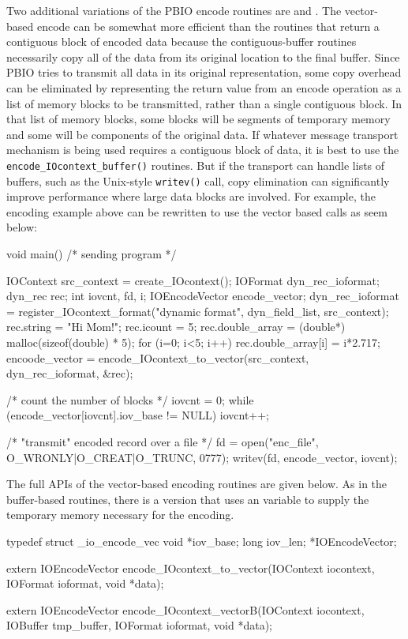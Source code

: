 Two additional variations of the PBIO encode routines are
 and
.  The vector-based encode can be
somewhat more efficient than the routines that return a contiguous block of
encoded data because the contiguous-buffer routines necessarily copy all of
the data from its original location to the final buffer.  Since PBIO tries
to transmit all data in its original representation, some copy overhead can
be eliminated by representing the return value from an encode operation as a
list of memory blocks to be transmitted, rather than a single contiguous
block.  In that list of memory blocks, some blocks will be segments of 
temporary memory and some will be components of the original data.
If whatever message transport mechanism is being used requires a contiguous
block of data, it is best to use the {\tt encode\_IOcontext\_buffer()}
routines.  But if the transport can handle lists of buffers, such as the
Unix-style {\tt writev()} call, copy elimination can significantly improve
performance where large data blocks are involved.  For example, the encoding
example above can be rewritten to use the vector based calls as seem below:
\begin{Code}
void main()     /* sending program */
{
    IOContext src_context = create_IOcontext();
    IOFormat dyn_rec_ioformat;
    dyn_rec rec;
    int iovcnt, fd, i;
    IOEncodeVector encode_vector;
    dyn_rec_ioformat = register_IOcontext_format("dynamic format",
                                                  dyn_field_list,
                                                  src_context);
    rec.string = "Hi Mom!";
    rec.icount = 5;
    rec.double_array = (double*) malloc(sizeof(double) * 5);
    for (i=0; i<5; i++) 
        rec.double_array[i] = i*2.717;
    encoode_vector = encode_IOcontext_to_vector(src_context, 
                        dyn_rec_ioformat, &rec);

    /* count the number of blocks */
    iovcnt = 0;
    while (encode_vector[iovcnt].iov_base != NULL) iovcnt++;

    /* "transmit" encoded record over a file */
    fd = open("enc_file", O_WRONLY|O_CREAT|O_TRUNC, 0777);
    writev(fd, encode_vector, iovcnt);
}
\end{Code}
The full APIs of the vector-based encoding routines are given below.  As in
the buffer-based routines, there is a version that uses an
 variable to supply the temporary memory necessary for the
encoding. 
\begin{WrapCode}
typedef struct _io_encode_vec {
     void *iov_base;
     long  iov_len;
} *IOEncodeVector;

extern IOEncodeVector
encode_IOcontext_to_vector(IOContext iocontext, IOFormat ioformat, void *data);

extern IOEncodeVector
encode_IOcontext_vectorB(IOContext iocontext, IOBuffer tmp_buffer, IOFormat ioformat, void *data);
\end{WrapCode}

